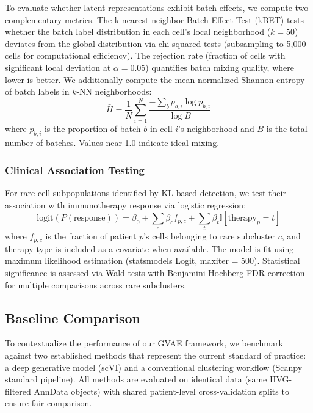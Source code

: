 \documentclass{article}
\begin{document}
To evaluate whether latent representations exhibit batch effects, we compute two complementary metrics. The k-nearest neighbor Batch Effect Test (kBET) \citep{buttner2019test} tests whether the batch label distribution in each cell's local neighborhood ($k = 50$) deviates from the global distribution via chi-squared tests (subsampling to 5,000 cells for computational efficiency). The rejection rate (fraction of cells with significant local deviation at $\alpha = 0.05$) quantifies batch mixing quality, where lower is better. We additionally compute the mean normalized Shannon entropy of batch labels in $k$-NN neighborhoods:
\begin{equation}
\bar{H} = \frac{1}{N} \sum_{i=1}^N \frac{-\sum_b p_{b,i} \log p_{b,i}}{\log B}
\end{equation}
where $p_{b,i}$ is the proportion of batch $b$ in cell $i$'s neighborhood and $B$ is the total number of batches. Values near 1.0 indicate ideal mixing.

\subsubsection{Clinical Association Testing}

For rare cell subpopulations identified by KL-based detection, we test their association with immunotherapy response via logistic regression:
\begin{equation}
\text{logit}(P(\text{response})) = \beta_0 + \sum_{c} \beta_c f_{p,c} + \sum_{t} \beta_t \mathbb{I}[\text{therapy}_p = t]
\end{equation}
where $f_{p,c}$ is the fraction of patient $p$'s cells belonging to rare subcluster $c$, and therapy type is included as a covariate when available. The model is fit using maximum likelihood estimation (statsmodels Logit, maxiter = 500). Statistical significance is assessed via Wald tests with Benjamini-Hochberg FDR correction for multiple comparisons across rare subclusters.

\subsection{Baseline Comparison}
\label{sec:baselines}

To contextualize the performance of our GVAE framework, we benchmark against two established methods that represent the current standard of practice: a deep generative model (scVI) and a conventional clustering workflow (Scanpy standard pipeline). All methods are evaluated on identical data (same HVG-filtered AnnData objects) with shared patient-level cross-validation splits to ensure fair comparison.
\end{document}
